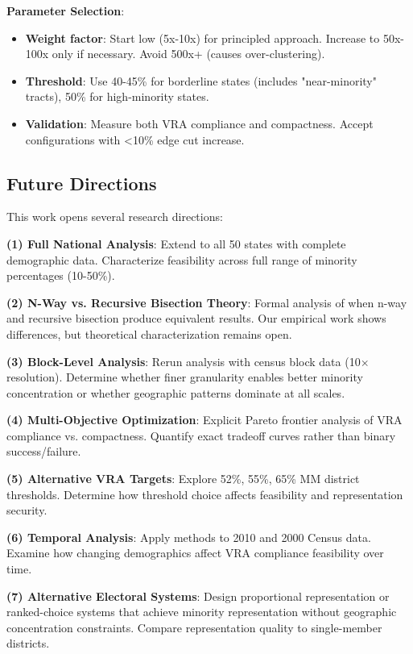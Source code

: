 \textbf{Parameter Selection}:
\begin{itemize}
\item \textbf{Weight factor}: Start low (5x-10x) for principled approach. Increase to 50x-100x only if necessary. Avoid 500x+ (causes over-clustering).
\item \textbf{Threshold}: Use 40-45\% for borderline states (includes "near-minority" tracts), 50\% for high-minority states.
\item \textbf{Validation}: Measure both VRA compliance and compactness. Accept configurations with <10\% edge cut increase.
\end{itemize}

\subsection{Future Directions}

This work opens several research directions:

\textbf{(1) Full National Analysis}: Extend to all 50 states with complete demographic data. Characterize feasibility across full range of minority percentages (10-50\%).

\textbf{(2) N-Way vs. Recursive Bisection Theory}: Formal analysis of when n-way and recursive bisection produce equivalent results. Our empirical work shows differences, but theoretical characterization remains open.

\textbf{(3) Block-Level Analysis}: Rerun analysis with census block data (10$\times$ resolution). Determine whether finer granularity enables better minority concentration or whether geographic patterns dominate at all scales.

\textbf{(4) Multi-Objective Optimization}: Explicit Pareto frontier analysis of VRA compliance vs. compactness. Quantify exact tradeoff curves rather than binary success/failure.

\textbf{(5) Alternative VRA Targets}: Explore 52\%, 55\%, 65\% MM district thresholds. Determine how threshold choice affects feasibility and representation security.

\textbf{(6) Temporal Analysis}: Apply methods to 2010 and 2000 Census data. Examine how changing demographics affect VRA compliance feasibility over time.

\textbf{(7) Alternative Electoral Systems}: Design proportional representation or ranked-choice systems that achieve minority representation without geographic concentration constraints. Compare representation quality to single-member districts.

